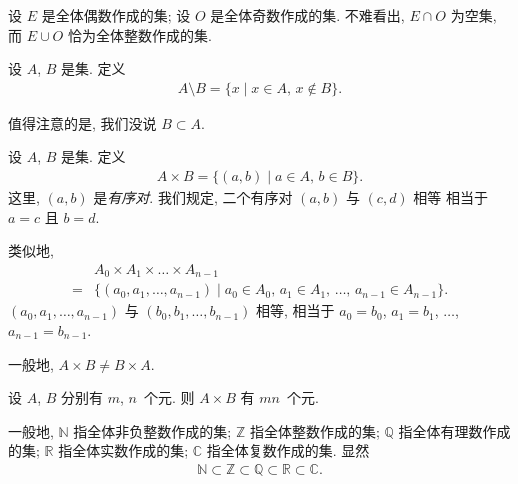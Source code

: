 \begin{example}
    设 $E$ 是全体偶数作成的集;
    设 $O$ 是全体奇数作成的集.
    不难看出, $E \cap O$ 为空集,
    而 $E \cup O$ 恰为全体整数作成的集.
\end{example}

\begin{definition}
    设 $A$, $B$ 是集. 定义
    \begin{align*}
        A \setminus B = \{ x \mid \text{$x \in A$, $x \notin B$} \}.
    \end{align*}
\end{definition}

\begin{remark}
    值得注意的是, 我们没说 $B \subset A$.
\end{remark}

\begin{definition}
    设 $A$, $B$ 是集. 定义
    \begin{align*}
        A \times B = \{ (a,b) \mid \text{$a \in A$, $b \in B$} \}.
    \end{align*}
    这里, $(a, b)$ 是\emph{有序对}.
    我们规定,
    二个有序对 $(a, b)$ 与 $(c, d)$ 相等%
    相当于 $a = c$ 且 $b = d$.

    类似地,
    \begin{align*}
             & A_0 \times A_1 \times \dots \times A_{n-1}                                                                 \\
        = {} & \{ (a_0, a_1, \dots, a_{n-1}) \mid \text{$a_0 \in A_0$, $a_1 \in A_1$, $\dots$, $a_{n-1} \in A_{n-1}$} \}.
    \end{align*}
    $(a_0, a_1, \dots, a_{n-1})$ 与
    $(b_0, b_1, \dots, b_{n-1})$ 相等,
    相当于
    $a_0 = b_0$, $a_1 = b_1$, $\dots$,
    $a_{n-1} = b_{n-1}$.
\end{definition}

\begin{remark}
    一般地, $A \times B \neq B \times A$.
\end{remark}

\begin{remark}
    设 $A$, $B$ 分别有 $m$, $n$~个元.
    则 $A \times B$ 有 $mn$~个元.
\end{remark}

\begin{definition}
    一般地,
    $\mathbb{N}$ 指全体非负整数作成的集;
    $\mathbb{Z}$ 指全体整数作成的集;
    $\mathbb{Q}$ 指全体有理数作成的集;
    $\mathbb{R}$ 指全体实数作成的集;
    $\mathbb{C}$ 指全体复数作成的集. 显然
    \begin{align*}
        \mathbb{N} \subset \mathbb{Z} \subset \mathbb{Q} \subset \mathbb{R} \subset \mathbb{C}.
    \end{align*}
\end{definition}

